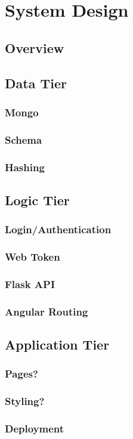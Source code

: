 \chapter{System Design}

\section{Overview}

\section{Data Tier}
\subsection{Mongo}
\subsection{Schema}
\subsection{Hashing}

\section{Logic Tier}
\subsection{Login/Authentication}
\subsection{Web Token}
\subsection{Flask API}
\subsection{Angular Routing}

\section{Application Tier}
\subsection{Pages?}
\subsection{Styling?}
\subsection{Deployment}